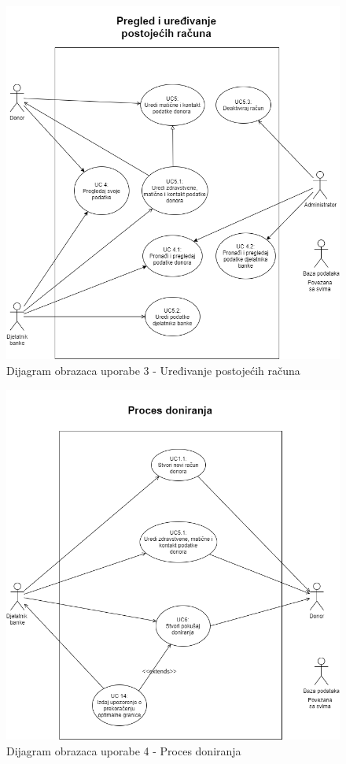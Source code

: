 				\begin{figure}[H]
    			\includegraphics[scale=0.6]{slike/UC3.png} %
    			\centering
    			\caption{Dijagram obrazaca uporabe 3 - Uređivanje postojećih računa}
    			\label{fig:promjene}
    	    	\end{figure}
    	    	
				\begin{figure}[H]
    			\includegraphics[scale=0.6]{slike/UC4.png} %
    			\centering
    			\caption{Dijagram obrazaca uporabe 4 - Proces doniranja}
    			\label{fig:promjene}
    	    	\end{figure}
    	    	
